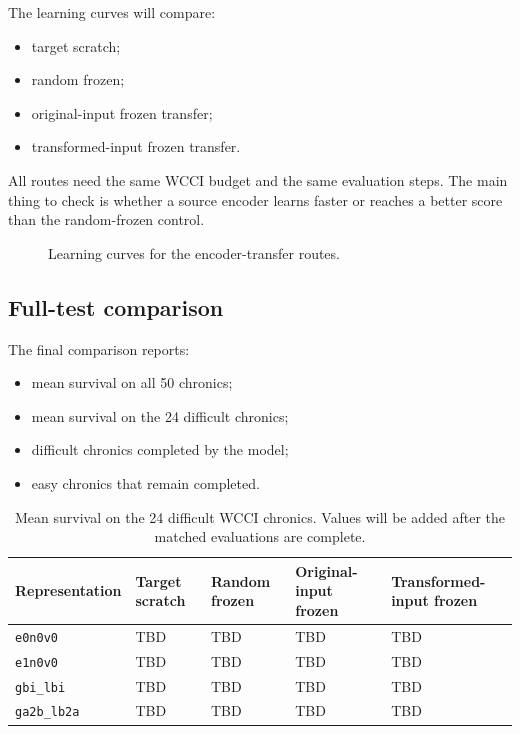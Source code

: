 The learning curves will compare:

\begin{itemize}
  \item target scratch;
  \item random frozen;
  \item original-input frozen transfer;
  \item transformed-input frozen transfer.
\end{itemize}

All routes need the same WCCI budget and the same evaluation steps. The main
thing to check is whether a source encoder learns faster or reaches a better
score than the random-frozen control.

\begin{figure}[H]
  \centering
  \caption{Learning curves for the encoder-transfer routes.}
  \label{fig:encoder-transfer-learning-curves}
\end{figure}

\subsection{Full-test comparison}

The final comparison reports:

\begin{itemize}
  \item mean survival on all 50 chronics;
  \item mean survival on the 24 difficult chronics;
  \item difficult chronics completed by the model;
  \item easy chronics that remain completed.
\end{itemize}

\begin{table}[H]
  \centering
  \small
  \caption{Mean survival on the 24 difficult WCCI chronics. Values will be
  added after the matched evaluations are complete.}
  \label{tab:encoder-transfer-difficult}
  \setlength{\tabcolsep}{4.5pt}
  \color{red}
  \begin{tabular}{L{0.18\textwidth}L{0.15\textwidth}L{0.15\textwidth}L{0.15\textwidth}L{0.15\textwidth}}
    \toprule
    Representation & Target scratch & Random frozen & Original-input frozen & Transformed-input frozen \\
    \midrule
    \texttt{e0n0v0}       & TBD & TBD & TBD & TBD \\
    \texttt{e1n0v0}       & TBD & TBD & TBD & TBD \\
    \texttt{gbi\_lbi}     & TBD & TBD & TBD & TBD \\
    \texttt{ga2b\_lb2a}   & TBD & TBD & TBD & TBD \\
    \bottomrule
  \end{tabular}
\end{table}

